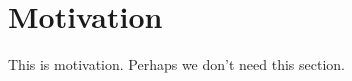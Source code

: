 \section{Motivation}
\label{sec:motivation}


This is motivation. Perhaps we don't need this section.




